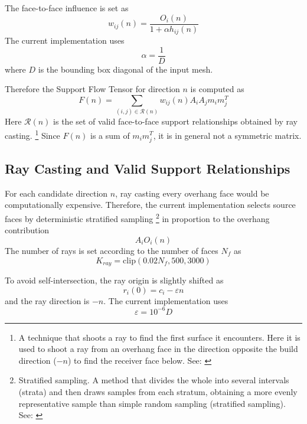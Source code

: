 \documentclass[11pt,a4paper]{article}
\begin{document}
The face-to-face influence is set as
\begin{equation}
w_{ij}(n)
=
\frac{O_i(n)}{1+\alpha h_{ij}(n)}
\end{equation}
The current implementation uses
\begin{equation}
\alpha = \frac{1}{D}
\end{equation}
where $D$ is the bounding box diagonal of the input mesh.

Therefore the Support Flow Tensor for direction $n$ is computed as
\begin{equation}
F(n)
=
\sum_{(i,j)\in \mathcal{R}(n)}
w_{ij}(n)
A_iA_j
m_i m_j^T
\end{equation}
Here $\mathcal{R}(n)$ is the set of valid face-to-face support relationships obtained by ray casting.%
\footnote{A technique that shoots a ray to find the first surface it encounters. Here it is used to shoot a ray
from an overhang face in the direction opposite the build direction ($-n$) to find the receiver face below.
See: \cite{roth1982}}
Since $F(n)$ is a sum of $m_i m_j^T$, it is in general not a symmetric matrix.

\subsection{Ray Casting and Valid Support Relationships}

For each candidate direction $n$, ray casting every overhang face would be computationally expensive.
Therefore, the current implementation selects source faces by deterministic stratified sampling%
\footnote{Stratified sampling. A method that divides the whole into several intervals (strata) and then draws samples from each stratum,
obtaining a more evenly representative sample than simple random sampling (stratified sampling). See: \cite{cochran1977}}
in proportion to the overhang contribution
\begin{equation}
A_iO_i(n)
\end{equation}
The number of rays is set according to the number of faces $N_f$ as
\begin{equation}
K_{ray}
=
\mathrm{clip}(0.02N_f,500,3000)
\label{eq:kray-budget}
\end{equation}

To avoid self-intersection, the ray origin is slightly shifted as
\begin{equation}
r_i(0)=c_i-\varepsilon n
\end{equation}
and the ray direction is $-n$.
The current implementation uses
\begin{equation}
\varepsilon = 10^{-6}D
\end{equation}
\end{document}
